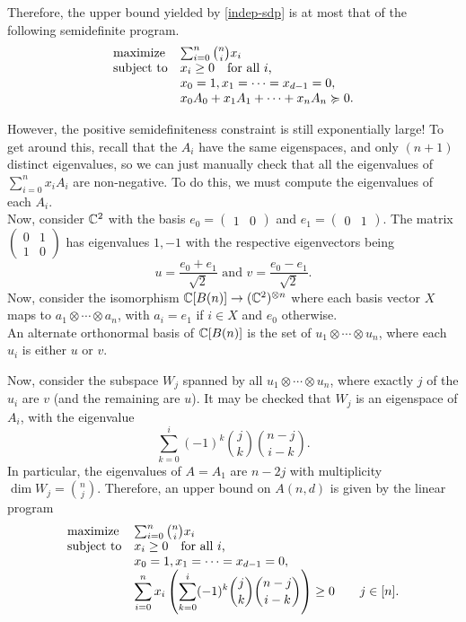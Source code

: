 	Therefore, the upper bound yielded by \cref{indep-sdp} is at most that of the following semidefinite program.
	\[
		\label{indep-sdp2}
		\begin{array}{ll@{}ll}
		\text{maximize}  & \sum_{i=0}^{n} \binom{n}{i} x_i  &\\
		\text{subject to} \displaystyle & x_i \ge 0 \quad \text{for all $i$,} &\\
		& x_0 = 1, x_1 = \cdots = x_{d-1} = 0, & \\
		& x_0 A_0 + x_1 A_1 + \cdots + x_n A_n \pge 0. &
		\end{array}
	\]

	However, the positive semidefiniteness constraint is still exponentially large! To get around this, recall that the $A_i$ have the same eigenspaces, and only $(n+1)$ distinct eigenvalues, so we can just manually check that all the eigenvalues of $\sum_{i=0}^n x_i A_i$ are non-negative. To do this, we must compute the eigenvalues of each $A_i$.\\
	Now, consider $\mathbb{C}^2$ with the basis $e_0 = \begin{pmatrix} 1 & 0 \end{pmatrix}$ and $e_1 = \begin{pmatrix} 0 & 1 \end{pmatrix}$. The matrix $\begin{pmatrix} 0 & 1 \\ 1 & 0 \end{pmatrix}$ has eigenvalues $1,-1$ with the respective eigenvectors being
	\[ u = \frac{e_0 + e_1}{\sqrt{2}} \text{ and } v = \frac{e_0 - e_1}{\sqrt{2}}. \]
	Now, consider the isomorphism $\mathbb{C}[B(n)] \to (\mathbb{C}^2)^{\otimes n}$ where each basis vector $X$ maps to $a_1 \otimes \cdots \otimes a_n$, with $a_i = e_1$ if $i \in X$ and $e_0$ otherwise.\\
	An alternate orthonormal basis of $\mathbb{C}[B(n)]$ is the set of $u_1 \otimes \cdots \otimes u_n$, where each $u_i$ is either $u$ or $v$.

	Now, consider the subspace $W_j$ spanned by all $u_1 \otimes \cdots \otimes u_n$, where exactly $j$ of the $u_i$ are $v$ (and the remaining are $u$). It may be checked that $W_j$ is an eigenspace of $A_i$, with the eigenvalue
	\[ \sum_{k=0}^{i} (-1)^k \binom{j}{k} \binom{n-j}{i-k}. \]
	In particular, the eigenvalues of $A = A_1$ are $n-2j$ with multiplicity $\dim W_j = \binom{n}{j}$. Therefore, an upper bound on $A(n,d)$ is given by the linear program
	\[
		\label{indep-sdp3}
		\begin{array}{ll@{}ll}
		\text{maximize}  & \sum_{i=0}^{n} \binom{n}{i} x_i  &\\
		\text{subject to} \displaystyle & x_i \ge 0 \quad \text{for all $i$,} &\\
		& x_0 = 1, x_1 = \cdots = x_{d-1} = 0, & \\
		& \displaystyle \sum_{i=0}^{n} x_i \left( \sum_{k=0}^{i} (-1)^k \binom{j}{k} \binom{n-j}{i-k} \right) \ge 0 & \qquad j \in [n].
		\end{array}
	\]

